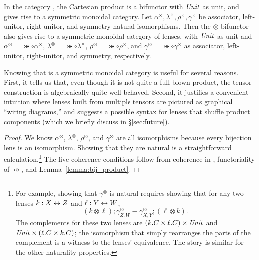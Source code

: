 \begin{defn}[$R$-similarity]
\begin{theorem}
\begin{lemma}
\begin{theorem}[No products]
\begin{prop}
In the category \SET, the Cartesian product is a bifunctor with $\mathit{Unit}$ as
unit, and gives rise to a symmetric monoidal category. Let
$\alpha^\times,\lambda^\times,\rho^\times,\gamma^\times$ be associator,
left-unitor, right-unitor, and symmetry natural isomorphisms. Then the
$\otimes$ bifunctor also gives rise to a symmetric monoidal category of
lenses, with $\mathit{Unit}$ as unit and $\alpha^\otimes=\bij\circ\alpha^\times$,
$\lambda^\otimes=\bij\circ\lambda^\times$,
$\rho^\otimes=\bij\circ\rho^\times$, and
$\gamma^\otimes=\bij\circ\gamma^\times$ as associator, left-unitor,
right-unitor, and symmetry, respectively.
\end{prop}

Knowing that \LENS{} is a symmetric monoidal category is useful for several
reasons.  First, it tells us that, even though it is not quite a full-blown
product, the tensor construction is algebraically quite well behaved.
Second, it justifies a convenient intuition where lenses built from multiple
tensors are pictured as graphical ``wiring diagrams,'' and suggests a
possible syntax for lenses that shuffle product components (which we briefly
discuss in \S\ref{sec:future}).

\iflater{}\fi

\iffull
\begin{proof}
We know $\alpha^\otimes$, $\lambda^\otimes$, $\rho^\otimes$, and
$\gamma^\otimes$ are all isomorphisms because every bijection lens is an
isomorphism. Showing that they are natural is a straightforward
calculation.\footnote{For example, showing that $\gamma^\otimes$ is natural
requires showing that for any two lenses $k : X \leftrightarrow Z$ and $\ell : Y \leftrightarrow
W$,
\[(k \otimes \ell);\gamma^\otimes_{Z,W} \equiv \gamma^\otimes_{X,Y};(\ell
\otimes k).\]
The complements for these two lenses are $(k.C \times \ell.C) \times \mathit{Unit}$
and $\mathit{Unit} \times (\ell.C \times k.C)$; the isomorphism that simply
rearranges the parts of the complement is a witness to the lenses'
equivalence.  The story is similar for the other naturality properties.}
The five coherence conditions follow from coherence in \SET, functoriality of
$\bij$, and Lemma~\ref{lemma:bij_product}.
\end{proof}
\fi


\end{theorem}
\end{lemma}
\end{theorem}
\end{defn}
